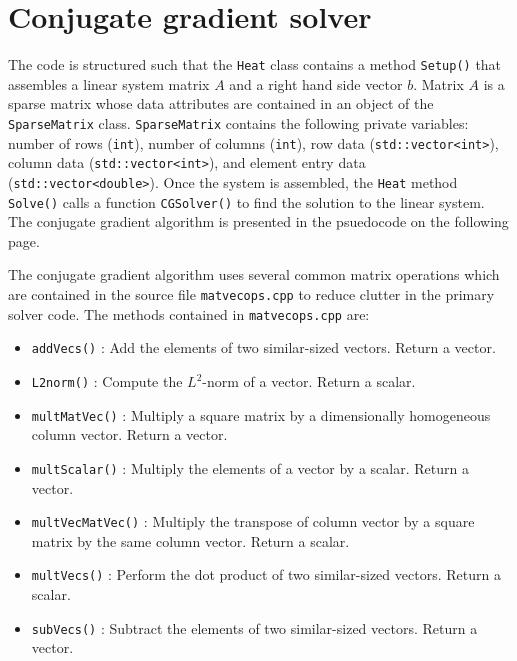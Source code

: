 \documentclass[12pt]{article}
\begin{document}
\section{Conjugate gradient solver}
  The code is structured such that the \texttt{Heat} class contains a method \texttt{Setup()} that assembles a linear system matrix $A$ and a right hand side vector $b$. Matrix $A$ is a sparse matrix whose data attributes are contained in an object of the \texttt{SparseMatrix} class. \texttt{SparseMatrix} contains the following private variables: number of rows (\texttt{int}), number of columns (\texttt{int}), row data (\texttt{std::vector<int>}), column data (\texttt{std::vector<int>}), and element entry data (\texttt{std::vector<double>}). Once the system is assembled, the \texttt{Heat} method \texttt{Solve()} calls a function \texttt{CGSolver()} to find the solution to the linear system. The conjugate gradient algorithm is presented in the psuedocode on the following page.
  
  The conjugate gradient algorithm uses several common matrix operations which are contained in the source file \texttt{matvecops.cpp} to reduce clutter in the primary solver code. The methods contained in \texttt{matvecops.cpp} are:
  
  \begin{itemize}[noitemsep]
    \item \texttt{addVecs()} : Add the elements of two similar-sized vectors.
      Return a vector. 
    \item \texttt{L2norm()} : Compute the $L^2$-norm of a vector. Return a
      scalar.
    \item \texttt{multMatVec()} : Multiply a square matrix by a
      dimensionally homogeneous column vector. Return a vector.
    \item \texttt{multScalar()} : Multiply the elements of a vector by a
    scalar. Return a vector.
    \item \texttt{multVecMatVec()} : Multiply the transpose of column vector
    by a square matrix by the same column vector. Return a scalar. 
    \item \texttt{multVecs()} : Perform the dot product of two similar-sized
    vectors. Return a scalar.
    \item \texttt{subVecs()} : Subtract the elements of two similar-sized
    vectors. Return a vector.
  \end{itemize}
\end{document}
